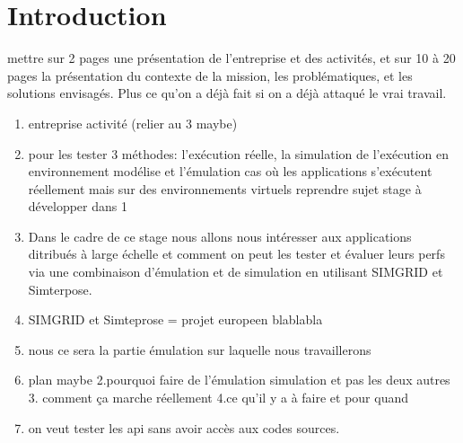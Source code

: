 \section{Introduction}
mettre sur 2 pages une présentation de l'entreprise et des activités, et sur 10 à 20 pages la présentation du contexte de la mission, les problématiques, et les solutions envisagés. Plus ce qu'on a déjà fait si on a déjà attaqué le vrai travail.
\begin{enumerate}
\item entreprise activité (relier au 3 maybe)
\item pour les tester 3 méthodes: l'exécution réelle, la simulation de l'exécution en environnement modélise et l'émulation cas où les applications s'exécutent réellement mais sur des environnements virtuels {\color{red} reprendre sujet stage à développer dans 1} 
\item Dans le cadre de ce stage nous allons nous intéresser aux applications ditribués à large échelle et comment on peut les tester et évaluer leurs perfs via une combinaison d'émulation et de simulation en utilisant SIMGRID et Simterpose.
\item SIMGRID et Simteprose = projet europeen blablabla
\item nous ce sera la partie émulation sur laquelle nous travaillerons
\item plan maybe 2.pourquoi faire de l'émulation simulation et pas les deux autres 3. comment ça marche réellement 4.ce qu'il y a à faire et pour quand
\item on veut tester les api sans avoir accès aux codes sources.
\end{enumerate}
